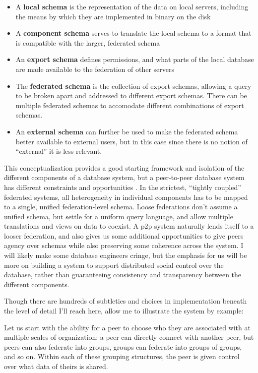 \documentclass[10pt]{article}
\begin{document}
\begin{multicols}{2}
\begin{itemize}
\item
  A \textbf{local schema} is the representation of the data on local
  servers, including the means by which they are implemented in binary
  on the disk
\item
  A \textbf{component schema} serves to translate the local schema to a
  format that is compatible with the larger, federated schema
\item
  An \textbf{export schema} defines permissions, and what parts of the
  local database are made available to the federation of other servers
\item
  The \textbf{federated schema} is the collection of export schemas,
  allowing a query to be broken apart and addressed to different export
  schemas. There can be multiple federated schemas to accomodate
  different combinations of export schemas.
\item
  An \textbf{external schema} can further be used to make the federated
  schema better available to external users, but in this case since
  there is no notion of ``external'' it is less relevant.
\end{itemize}

This conceptualization provides a good starting framework and isolation
of the different components of a database system, but a peer-to-peer
database system has different constraints and opportunities \cite{bonifatiDistributedDatabasesPeertopeer2008} . In the strictest,
``tightly coupled'' federated systems, all heterogeneity in individual
components has to be mapped to a single, unified federation-level
schema. Loose federations don't assume a unified schema, but settle for
a uniform query language, and allow multiple translations and views on
data to coexist. A p2p system naturally lends itself to a looser
federation, and also gives us some additional opportunities to give
peers agency over schemas while also preserving some coherence across
the system. I will likely make some database engineers cringe, but the
emphasis for us will be more on building a system to support distributed
social control over the database, rather than guaranteeing consistency
and transparency between the different components.

Though there are hundreds of subtleties and choices in implementation
beneath the level of detail I'll reach here, allow me to illustrate the
system by example:

Let us start with the ability for a peer to choose who they are
associated with at multiple scales of organization: a peer can directly
connect with another peer, but peers can also federate into groups,
groups can federate into groups of groups, and so on. Within each of
these grouping structures, the peer is given control over what data of
theirs is shared.


\end{multicols}
\end{document}
